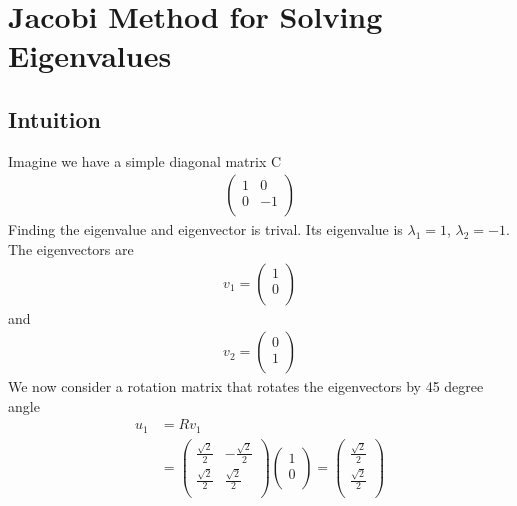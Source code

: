 \documentclass[a4paper]{article}
\begin{document}
\section{Jacobi Method for Solving Eigenvalues}
\subsection{Intuition}
Imagine we have a simple diagonal matrix C\\
\begin{align*}
\left( \begin{array}{cc}
1 & 0\\
0 & -1\\
\end{array} \right)
\end{align*}
Finding the eigenvalue and eigenvector is trival. Its eigenvalue is $\lambda_1 = 1$, $\lambda_2 = -1$. The eigenvectors are
\begin{align*}
	v_1 = 
	\left(  \begin{array} {c}
		1 \\
		0 \\
	\end{array} \right) 
\end{align*}
and
\begin{align*}
	v_2 = 
	\left( \begin{array} {c}
		0 \\
		1 \\
	\end{array} \right) 
\end{align*}
We now consider a rotation matrix that rotates the eigenvectors by 45 degree angle
\begin{align*}
	u_1 & = R v_1 \\
	& =\left(  \begin{array} {cc}
		\frac{\sqrt{2}}{2}& -\frac{\sqrt{2}}{2}\\
		\frac{\sqrt{2}}{2}& \frac{\sqrt{2}}{2}\\
	\end{array} \right) 
	\left(  \begin{array} {c}
		1 \\
		0 \\
	\end{array} \right) 
	=
	\left(  \begin{array} {c}
		\frac{\sqrt{2}}{2} \\
		\frac{\sqrt{2}}{2} \\
	\end{array} \right) 
\end{align*}
\end{document}
